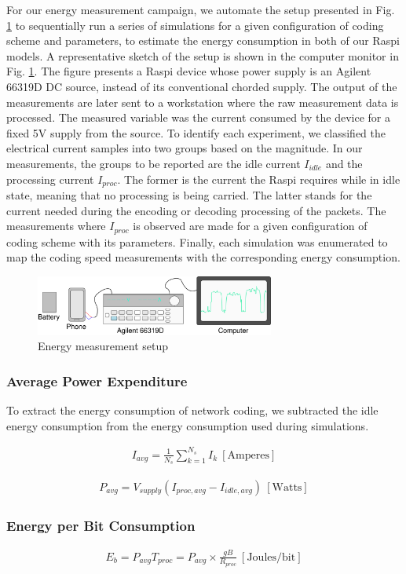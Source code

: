 For our energy measurement campaign, we automate the setup presented
in Fig. \ref{fig:measurement_setup} to sequentially run a series of
simulations for a given configuration of coding scheme and parameters,
to estimate the energy consumption in both of our \ac{Raspi}
models. A representative sketch of the setup is shown in the
computer monitor in Fig. \ref{fig:measurement_setup}. The figure presents
a \ac{Raspi} device whose power supply is an Agilent 66319D \ac{DC} source,
instead of its conventional chorded supply. The output of the measurements
are later sent to a workstation where the raw measurement data is processed.
The measured variable was the current consumed by the device for a fixed
5V supply from the source. To identify each experiment, we classified the
electrical current samples into two groups based on the magnitude. In our
measurements, the groups to be reported are the idle current $I_{idle}$
and the processing current $I_{proc}$. The former is the current the
\ac{Raspi} requires while in idle state, meaning that no processing
is being carried. The latter stands for the current needed during
the encoding or decoding processing of the packets. The measurements
where $I_{proc}$ is observed are made for a given configuration of
coding scheme with its parameters. Finally, each simulation was enumerated
to map the coding speed measurements with the corresponding energy
consumption.

\begin{figure}[ht!]
\centering
\includegraphics[width=0.7\textwidth]{images/measurement_setup.eps}
\caption{Energy measurement setup}
\label{fig:measurement_setup}
\end{figure}

\subsubsection{Average Power Expenditure}
To extract the energy consumption of network coding, we subtracted the
idle energy consumption from the energy consumption used during simulations.

%
\begin{align} \label{eq:avg_current}
I_{avg} = \frac{1}{N_s}\sum_{k=1}^{N_s} I_{k}  ~[\mathrm{Amperes}]
\end{align}
%


%
\begin{align} \label{eq:avg_power}
P_{avg} = V_{supply}(I_{proc,avg} - I_{idle,avg}) ~[\mathrm{Watts}]
\end{align}
%
\subsubsection{Energy per Bit Consumption}
%
\begin{align} \label{eq:goodput}
E_b = P_{avg} T_{proc} = P_{avg} \times \frac{gB}{R_{proc}} ~[\mathrm{Joules/bit}]
\end{align}
%
